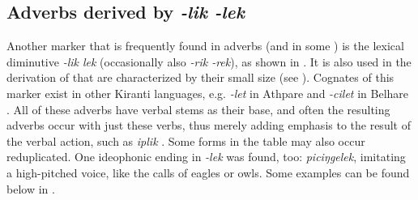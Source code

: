     
\subsection{Adverbs derived by  \emph{-lik \ti -lek}}

Another marker that is frequently found  in adverbs (and in some ) is the lexical diminutive \emph{-lik \ti lek} (occasionally also \emph{-rik \ti -rek}), as shown in . It is also used in the derivation of  that are characterized by their small size (see ). Cognates of this marker exist in other Kiranti languages, e.g. \emph{-let} in Athpare \cite{Ebert1997A-grammar} and \emph{-cilet} in Belhare  \citep{Bickel2003Belhare}. All of these adverbs have verbal stems as their base, and often the resulting adverbs occur with just these verbs, thus merely adding  emphasis to the result of the verbal action, such as \emph{iplik} . Some forms in the table may also occur reduplicated. One ideophonic  ending in \emph{-lek} was found, too: \emph{piciŋgelek}, imitating a high-pitched voice, like the calls of eagles or owls. Some examples can be found below in \Next.




